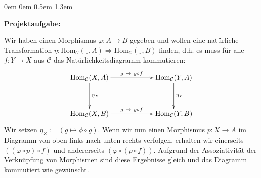 \documentclass[a4paper,ngerman]{scrartcl}
\theoremstyle{definition}
\theoremstyle{plain}
\theoremstyle{remark}
\newcommand{\C}{\mathcal{C}}
\newcommand{\Hom}{\mathrm{Hom}}
\newcommand{\freist}{\underline{\ \ }}
\begin{document}
\begin{list}{}{0em \leftmargin0em \itemindent0.5em \itemsep 1.3em}
\item[\textbf{Projektaufgabe:}]\mbox{}

Wir haben einen Morphismus $\varphi:A \to B$ gegeben und wollen eine natürliche Transformation $\eta:\Hom_{\C}(\freist, A) \Rightarrow \Hom_{\C}(\freist, B)$ finden, d.h. es muss für alle $f:Y \to X$ aus $\C$ das Natürlichkeitsdiagramm kommutieren:
\[ \xymatrixcolsep{5pc}\xymatrixrowsep{3pc}\xymatrix{
  \Hom_{\C}(X, A) \ar[d]^{\eta_X} \ar[r]^{g\ \mapsto\ g \circ f} & \Hom_{\C}(Y, A) \ar[d]^{\eta_Y} \\
  \Hom_{\C}(X, B) \ar[r]^{g\ \mapsto\ g \circ f} & \Hom_{\C}(Y, B)
} \]
Wir setzen $\eta_{Z} := (g \mapsto \phi \circ g)$. Wenn wir nun einen Morphismus $p:X \to A$ im Diagramm von oben links nach unten rechts verfolgen, erhalten wir einerseits $((\varphi \circ p) \circ f)$ und andererseits
$(\varphi \circ (p \circ f))$. Aufgrund der Assoziativität der Verknüpfung von Morphismen sind diese Ergebnisse gleich und das Diagramm kommutiert wie gewünscht.

\end{list}
\end{document}

